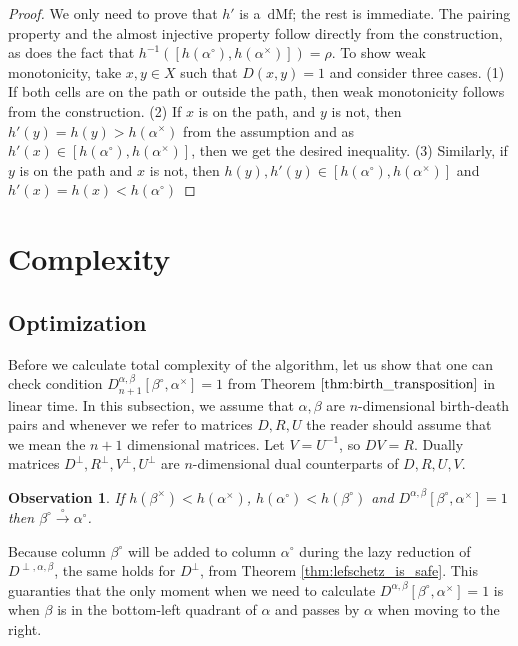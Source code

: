 \documentclass[a4paper,12pt, USenglish,cleveref,autoref,thm-restate]{article}
\newtheorem{observation}[theorem]{Observation}
\newcommand{\mf}{h}
\newcommand{\omf}{h'}
\newcommand{\dmf}{\text{dMf}}
\newcommand{\mU}{U}
\newcommand{\cmU}{\mU^{\perp}}
\newcommand{\mR}{R}
\newcommand{\cmR}{R^{\perp}}
\newcommand{\mV}{V}
\newcommand{\cmV}{V^{\perp}}
\newcommand{\mD}{D}
\newcommand{\cmD}{D^{\perp}}
\newcommand{\cx}{x}
\newcommand{\cy}{y}
\newcommand{\bth}[1]{#1^\circ}
\newcommand{\dth}[1]{#1^{\!\times}}
\newcommand{\cohomo}{\xrightarrow{\circ}}
\newcommand{\bds}{\alpha}
\newcommand{\bdt}{\beta}
\begin{document}
\begin{appendices}
\RevPathProp*

\begin{proof}
    We only need to prove that $\omf$ is a~$\dmf$; the rest is immediate.
    The pairing property and the almost injective property follow directly from the construction, as does the fact that $\mf^{-1}([\mf(\bth\bds),\mf(\dth\bds)]) = \rho$. To show weak monotonicity, take $\cx,\cy \in X$ such that $D(\cx,\cy) = 1$ and consider three cases. (1) If both cells are on the path or outside the path, then weak monotonicity follows from  the construction. (2) If $\cx$ is on the path, and $\cy$ is not, then $\omf(y) = \mf(\cy) > \mf(\dth\bds)$ from the assumption and as $\omf(x) \in [\mf(\bth\bds),\mf(\dth\bds)]$, then we get the desired inequality. (3) Similarly, if $\cy$ is on the path and $\cx$ is not, then $\mf(\cy), \omf(y) \in [\mf(\bth\bds),\mf(\dth\bds)]$ and $\omf(x) = \mf(x) < \mf(\bth\bds)$
\end{proof}


\section{Complexity}\label{sec:complexity}

\subsection{Optimization}
 
 Before we calculate total complexity of the algorithm, let us show that one can check condition $\mD_{n+1}^{\bds,\bdt}[\bth\bdt,\dth\bds] = 1$ from Theorem $\ref{thm:birth_transposition}$ in linear time. In this subsection, we assume that $\bds,\bdt$ are $n$-dimensional birth-death pairs and whenever we refer to matrices $\mD,\mR,\mU$ the reader should assume that we mean the $n+1$ dimensional matrices. 
 Let $\mV = \mU^{-1}$, so $\mD\mV = \mR$. Dually matrices $\cmD,\cmR,\cmV,\cmU$ are $n$-dimensional dual counterparts of $\mD,\mR,\mU,\mV$.



\begin{observation}\label{obs:lef_matrix_and_trans}
    If $\mf(\dth\beta)<\mf(\dth\alpha)$, $\mf(\bth\alpha) < \mf(\bth\beta)$ and $\mD^{\bds,\bdt}[\bth\bdt,\dth\bds] = 1$ then $\bth\beta \cohomo \bth\alpha$.
\end{observation}

\noindent Because column $\bth\bdt$ will be added to column $\bth\bds$ during the lazy reduction of $\mD^{\perp,\bds,\bdt}$, the same holds for $D^{\perp}$, from Theorem \ref{thm:lefschetz_is_safe}. This guaranties that the only moment when we need to calculate $\mD^{\bds,\bdt}[\bth\bdt,\dth\bds] = 1$ is when $\bdt$ is in the bottom-left quadrant of $\bds$ and passes by $\bds$ when moving to the right.



\end{appendices}
\end{document}
